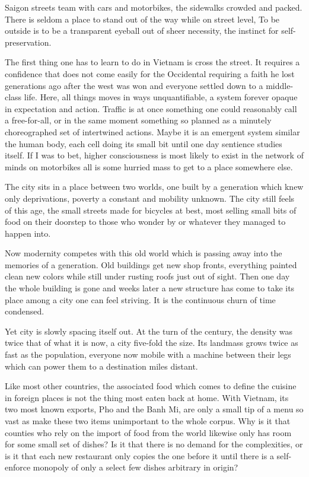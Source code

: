\documentclass[ebook, 10pt, openright, onecolumn]{memoir}
\newcommand*\td[1]{
  \todo[inline]{
     #1 
  }
}
\newcommand*\finish{\td{ ----- Finish this section -----}}
\begin{document}
Saigon streets team with cars and motorbikes, the sidewalks crowded and packed.
There is seldom a place to stand out of the way while on street level, To be
outside is to be a transparent eyeball out of sheer necessity, the instinct for
self-preservation.

The first thing one has to learn to do in Vietnam is cross the street.  It
requires a confidence that does not come easily for the Occidental requiring a
faith he lost generations ago after the west was won and everyone settled down
to a middle-class life.  Here, all things moves in ways unquantifiable, a system
forever opaque in expectation and action.  Traffic is at once something one
could reasonably call a free-for-all, or in the same moment something so planned
as a minutely choreographed set of intertwined actions.  Maybe it is an emergent
system similar the human body, each cell doing its small bit until one day
sentience studies itself.  If I was to bet, higher consciousness is most likely
to exist in the network of minds on motorbikes all is some hurried mass to get
to a place somewhere else.

The city sits in a place between two worlds, one built by a generation which
knew only deprivations, poverty a constant and mobility unknown.  The city still
feels of this age, the small streets made for bicycles at best, most selling
small bits of food on their doorstep to those who wonder by or whatever they
managed to happen into.

Now modernity competes with this old world which is passing away into the
memories of a generation.  Old buildings get new shop fronts, everything painted
clean new colors while still under rusting roofs just out of sight.  Then one
day the whole building is gone and weeks later a new structure has come to take
its place among a city one can feel striving.  It is the continuous churn of
time condensed.

Yet city is slowly spacing itself out.  At the turn of the century, the density
was twice that of what it is now, a city five-fold the size.  Its landmass grows
twice as fast as the population, everyone now mobile with a machine between
their legs which can power them to a destination miles distant.

\finish{}

Like most other countries, the associated food which comes to define the cuisine
in foreign places is not the thing most eaten back at home. With Vietnam, its
two most known exports, Pho and the Banh Mi, are only a small tip of a menu so
vast as make these two items unimportant to the whole corpus.  Why is it that
counties who rely on the import of food from the world likewise only has room
for some small set of dishes?  Is it that there is no demand for the
complexities, or is it that each new restaurant only copies the one before it
until there is a self-enforce monopoly of only a select few dishes arbitrary in
origin?
\end{document}
